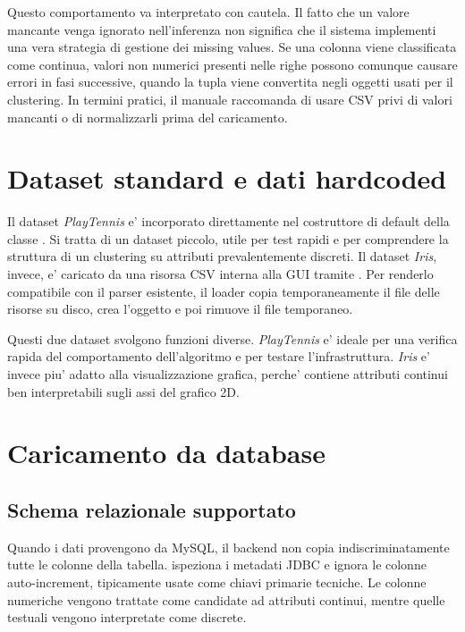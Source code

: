 Questo comportamento va interpretato con cautela. Il fatto che un valore mancante venga
ignorato nell'inferenza non significa che il sistema implementi una vera strategia di
gestione dei missing values. Se una colonna viene classificata come continua, valori non
numerici presenti nelle righe possono comunque causare errori in fasi successive, quando
la tupla viene convertita negli oggetti usati per il clustering. In termini pratici, il
manuale raccomanda di usare CSV privi di valori mancanti o di normalizzarli prima del caricamento.

\section{Dataset standard e dati hardcoded}

Il dataset \emph{PlayTennis} e' incorporato direttamente nel costruttore di default della
classe . Si tratta di un dataset piccolo, utile per test rapidi e per
comprendere la struttura di un clustering su attributi prevalentemente discreti. Il
dataset \emph{Iris}, invece, e' caricato da una risorsa CSV interna alla GUI tramite
. Per renderlo compatibile con il parser esistente, il loader copia
temporaneamente il file delle risorse su disco, crea l'oggetto  e poi
rimuove il file temporaneo.

Questi due dataset svolgono funzioni diverse. \emph{PlayTennis} e' ideale per una
verifica rapida del comportamento dell'algoritmo e per testare l'infrastruttura.
\emph{Iris} e' invece piu' adatto alla visualizzazione grafica, perche' contiene
attributi continui ben interpretabili sugli assi del grafico 2D.

\section{Caricamento da database}

\subsection{Schema relazionale supportato}

Quando i dati provengono da MySQL, il backend non copia indiscriminatamente tutte le
colonne della tabella.  ispeziona i metadati JDBC e ignora le colonne
auto-increment, tipicamente usate come chiavi primarie tecniche. Le colonne numeriche
vengono trattate come candidate ad attributi continui, mentre quelle testuali vengono
interpretate come discrete.

